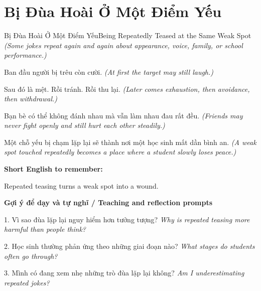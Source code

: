 \section{Bị Đùa Hoài Ở Một Điểm Yếu}
\begin{truyen}{Bị Đùa Hoài Ở Một Điểm Yếu}{Being Repeatedly Teased at the Same Weak Spot}
\textit{(Some jokes repeat again and again about appearance, voice, family, or school performance.)}

Ban đầu người bị trêu còn cười.
\textit{(At first the target may still laugh.)}

Sau đó là mệt. Rồi tránh. Rồi thu lại.
\textit{(Later comes exhaustion, then avoidance, then withdrawal.)}

Bạn bè có thể không đánh nhau mà vẫn làm nhau đau rất đều.
\textit{(Friends may never fight openly and still hurt each other steadily.)}

\end{truyen}

\begin{baihoc}
Một chỗ yếu bị chạm lặp lại sẽ thành nơi một học sinh mất dần bình an.
\textit{(A weak spot touched repeatedly becomes a place where a student slowly loses peace.)}
\end{baihoc}

\begin{ghinhoanh}
\textbf{Short English to remember:}

Repeated teasing turns a weak spot into a wound.

\end{ghinhoanh}

\begin{tuhocnhanh}
\textbf{Gợi ý để dạy và tự nghĩ / Teaching and reflection prompts}

1. Vì sao đùa lặp lại nguy hiểm hơn tưởng tượng? \textit{Why is repeated teasing more harmful than people think?}

2. Học sinh thường phản ứng theo những giai đoạn nào? \textit{What stages do students often go through?}

3. Mình có đang xem nhẹ những trò đùa lặp lại không? \textit{Am I underestimating repeated jokes?}
\end{tuhocnhanh}
\ngancach


